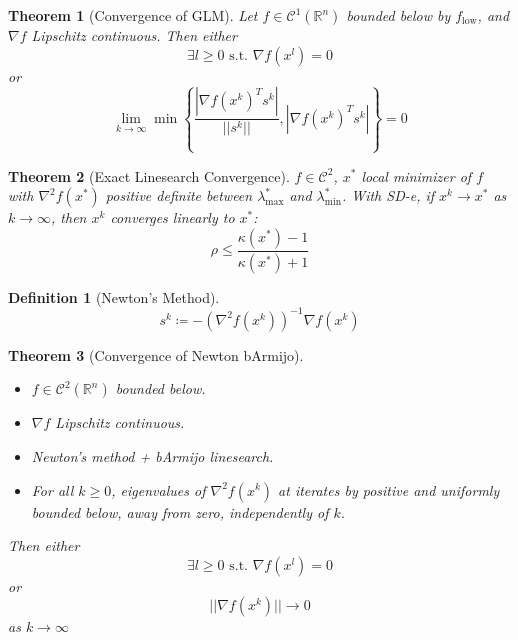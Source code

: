\documentclass[a4paper]{article}
\newcommand{\R}{\mathbb{R}}
\newcommand{\C}{\mathcal{C}}
\newcommand{\st}{\text{ s.t. }}
\newcommand{\norm}[1]{\lvert \lvert #1 \rvert \rvert}
\newtheorem{theorem}{Theorem}
\newtheorem*{definition*}{Definition}
\begin{document}
\setcounter{theorem}{3}
\begin{theorem}[Convergence of GLM]
    Let $f \in \C^1 \left( \R^n \right)$ bounded below by $f_{\text{low}}$,
    and $\nabla f$ Lipschitz continuous.
    Then either
    \begin{equation*}
        \exists l \geq 0 \st \nabla f \left( x^l \right) = 0
    \end{equation*}
    or
    \begin{equation*}
        \lim_{k \rightarrow \infty} \min \left\{ \frac{|\nabla f \left( x^k \right)^T s^k|}{\norm{s^k}}, |\nabla f \left( x^k \right)^T s^k| \right\} = 0
    \end{equation*}
\end{theorem}

\setcounter{theorem}{5}
\begin{theorem}[Exact Linesearch Convergence]
    $f \in \C^2$, $x^*$ local minimizer of $f$ with $\nabla^2 f\left( x^* \right)$ positive definite between $\lambda_{\max}^*$ and $\lambda_{\min}^{*}$.
    With SD-e, if $x^k \rightarrow x^*$ as $k \rightarrow \infty$, then $x^k$ converges linearly to $x^*$:
    \begin{equation*}
        \rho \leq \frac{\kappa \left( x^* \right) - 1}{\kappa \left( x^* \right) + 1}
    \end{equation*}
\end{theorem}

\begin{definition*}[Newton's Method]
    \begin{equation*}
        s^k \coloneqq - \left( \nabla^2 f \left( x^k \right) \right)^{-1} \nabla f \left( x^k \right)
    \end{equation*}
\end{definition*}

\setcounter{theorem}{8}
\begin{theorem}[Convergence of Newton bArmijo]
    \begin{itemize}
        \item $f \in \C^2 \left( \R^n \right)$ bounded below.
        \item $\nabla f$ Lipschitz continuous.
        \item Newton's method + bArmijo linesearch.
        \item For all $k \geq 0$, eigenvalues of $\nabla^2 f\left( x^k \right)$ at iterates by positive and uniformly bounded below, away from zero, independently of $k$.
    \end{itemize}
    Then either
    \begin{equation*}
        \exists l \geq 0 \st \nabla f \left( x^l \right) = 0
    \end{equation*}
    or
    \begin{equation*}
        \norm{\nabla f \left( x^k \right)} \rightarrow 0
    \end{equation*}
    as $k \rightarrow \infty$
\end{theorem}
\end{document}
